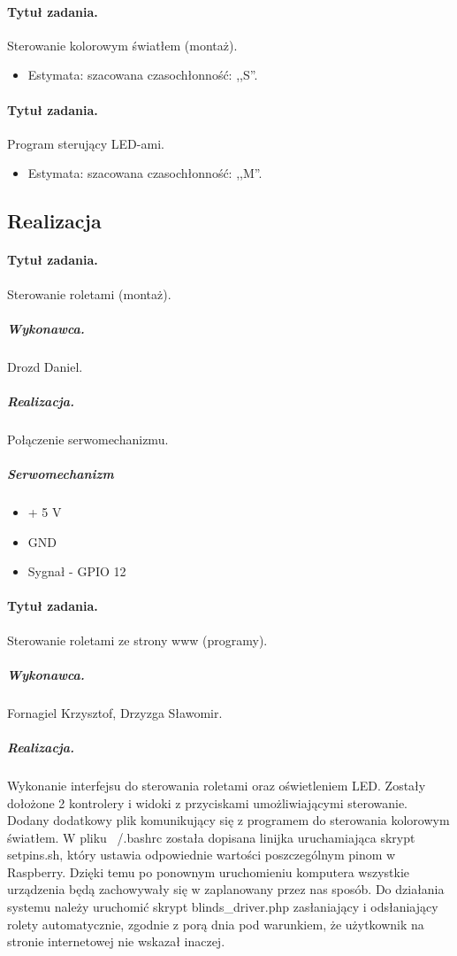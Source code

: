 \paragraph{Tytuł zadania.} Sterowanie kolorowym światłem (montaż).
\begin{itemize}
	\item Estymata: szacowana czasochłonność: ,,S''.
\end{itemize}

\paragraph{Tytuł zadania.} Program sterujący LED-ami.
\begin{itemize}
	\item Estymata: szacowana czasochłonność: ,,M''.
\end{itemize}


\subsection{Realizacja}

\paragraph{Tytuł zadania.} Sterowanie roletami (montaż).
\subparagraph{Wykonawca.} Drozd Daniel.
\subparagraph{Realizacja.} Połączenie serwomechanizmu.
\subparagraph{Serwomechanizm}

\begin{itemize}
	\item + 5 V
	\item GND
	\item Sygnał - GPIO 12
\end{itemize}
\paragraph{Tytuł zadania.} Sterowanie roletami ze strony www (programy).
\subparagraph{Wykonawca.} Fornagiel Krzysztof, Drzyzga Sławomir.
\subparagraph{Realizacja.} Wykonanie interfejsu do sterowania roletami oraz oświetleniem LED. Zostały dołożone 2 kontrolery i widoki z przyciskami umożliwiającymi sterowanie. Dodany dodatkowy plik komunikujący się z programem do sterowania kolorowym światłem. W pliku ~/.bashrc została dopisana linijka uruchamiająca skrypt setpins.sh, który ustawia odpowiednie wartości poszczególnym pinom w Raspberry. Dzięki temu po ponownym uruchomieniu komputera wszystkie urządzenia będą zachowywały się w zaplanowany przez nas sposób. Do działania systemu należy uruchomić skrypt blinds_driver.php zasłaniający i odsłaniający rolety automatycznie, zgodnie z porą dnia pod warunkiem, że użytkownik na stronie internetowej nie wskazał inaczej.
